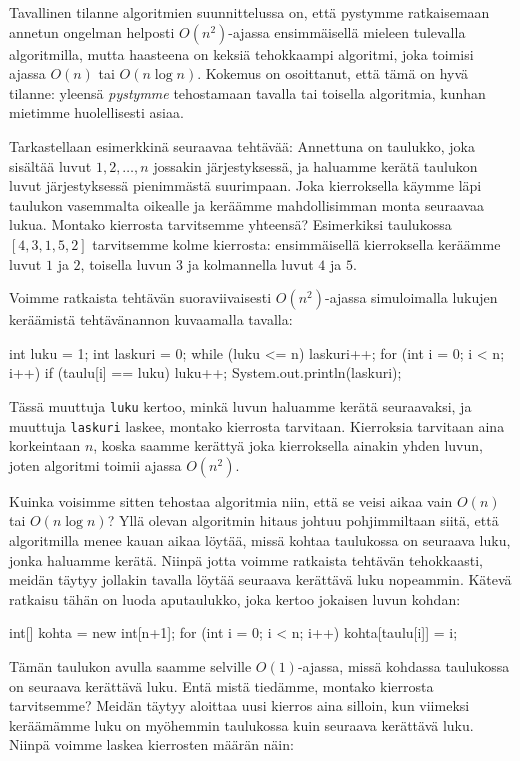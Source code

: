 Tavallinen tilanne algoritmien suunnittelussa on,
että pystymme ratkaisemaan annetun ongelman
helposti $O(n^2)$-ajassa ensimmäisellä mieleen tulevalla algoritmilla,
mutta haasteena on keksiä tehokkaampi algoritmi,
joka toimisi ajassa $O(n)$ tai $O(n \log n)$.
Kokemus on osoittanut, että tämä on hyvä tilanne:
yleensä \emph{pystymme} tehostamaan
tavalla tai toisella algoritmia,
kunhan mietimme huolellisesti asiaa.

Tarkastellaan esimerkkinä seuraavaa tehtävää:
Annettuna on taulukko, joka sisältää luvut $1,2,\dots,n$
jossakin järjestyksessä,
ja haluamme kerätä taulukon luvut järjestyksessä pienimmästä suurimpaan.
Joka kierroksella käym\-me läpi taulukon vasemmalta
oikealle ja keräämme mahdollisimman monta seuraavaa lukua.
Montako kierrosta tarvitsemme yhteensä?
Esimerkiksi taulukossa $[4,3,1,5,2]$
tarvitsemme kolme kierrosta:
ensimmäisellä kierroksella keräämme luvut $1$ ja $2$,
toisella luvun $3$ ja kolmannella luvut $4$ ja $5$.

Voimme ratkaista tehtävän suoraviivaisesti $O(n^2)$-ajassa
simuloimalla lukujen keräämistä tehtävänannon kuvaamalla tavalla:

\begin{code}
int luku = 1;
int laskuri = 0;
while (luku <= n) {
    laskuri++;
    for (int i = 0; i < n; i++) {
        if (taulu[i] == luku) luku++;
    }
}
System.out.println(laskuri);
\end{code}

Tässä muuttuja \texttt{luku} kertoo,
minkä luvun haluamme kerätä seuraavaksi,
ja muuttuja \texttt{laskuri} laskee,
montako kierrosta tarvitaan.
Kierroksia tarvitaan aina korkeintaan $n$,
koska saamme kerättyä joka kierroksella
ainakin yhden luvun,
joten algoritmi toimii ajassa $O(n^2)$.

Kuinka voisimme sitten tehostaa algoritmia niin,
että se veisi aikaa vain $O(n)$ tai $O(n \log n)$?
Yllä olevan algoritmin hitaus johtuu pohjimmiltaan siitä,
että algoritmilla menee kauan aikaa löytää,
missä kohtaa taulukossa on seuraava luku,
jonka haluamme kerätä.
Niinpä jotta voimme ratkaista tehtävän tehokkaasti,
meidän täytyy jollakin tavalla löytää seuraava kerät\-tävä luku nopeammin.
Kätevä ratkaisu tähän on luoda aputaulukko,
joka kertoo jokaisen luvun kohdan:

\begin{code}
int[] kohta = new int[n+1];
for (int i = 0; i < n; i++) {
    kohta[taulu[i]] = i;
}
\end{code}

Tämän taulukon avulla saamme selville $O(1)$-ajassa,
missä kohdassa taulukossa on seuraava kerättävä luku.
Entä mistä tiedämme, montako kierrosta tarvitsemme?
Meidän täytyy aloittaa uusi kierros aina silloin,
kun viimeksi keräämämme luku on myöhemmin taulukossa
kuin seuraava kerättävä luku.
Niinpä voimme laskea kierrosten määrän näin:


